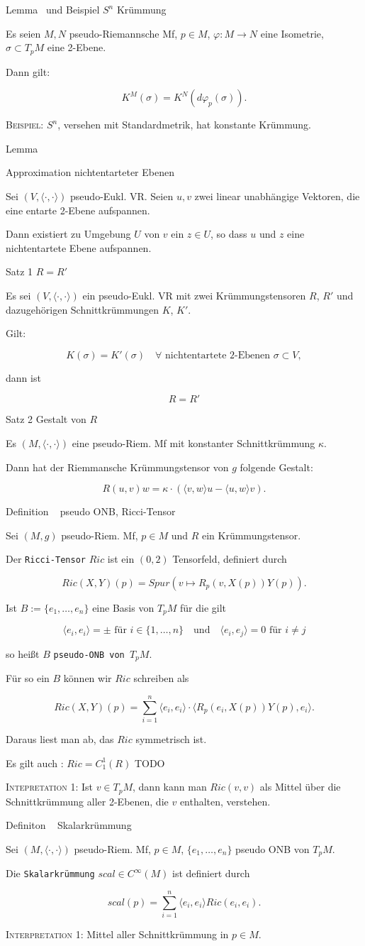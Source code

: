\documentclass[a6paper,11pt,grid=front]{kartei}
\newcommand{\fl}[1]{\begin{flushleft}
 #1 \end{flushleft}}
\newcommand{\blf}[1]{\langle #1 \rangle}
\newcounter{def}
\newcounter{satz}
\newcommand{\defreset}{\setcounter{def}{1}}
\newcommand{\satzreset}{\setcounter{satz}{1}}
\newcommand{\thisdef}{\thedef\ \stepcounter{def}}
\newcommand{\thissatz}{\thesatz\ \stepcounter{satz}}
\begin{document}
\nonameyet
{Lemma \thissatz und Beispiel} {$S^n$ Krümmung}
{
Es seien $M,N$ pseudo-Riemannsche Mf, $p\in M$, $\varphi: M \to N$ eine Isometrie,
$\sigma \subset T_pM$ eine 2-Ebene.
\fl{Dann gilt:}
\[
K^M(\sigma) = K^N(d\varphi_p(\sigma)).
\]
\fl{\textsc{Beispiel:} $S^n$, versehen mit Standardmetrik, hat konstante
Krümmung.}
}
{}

\nonameyet
{Lemma \thissatz} 
{ 
\begin{minipage}{0.43 \linewidth}
Approximation nichtentarteter Ebenen
\end{minipage}
}
{
Sei $(V,\blf{\cdot,\cdot})$ pseudo-Eukl. VR. Seien $u,v$ zwei linear
unabhängige Vektoren, die eine entarte 2-Ebene aufspannen.
\fl{Dann existiert zu Umgebung $U$ von $v$ ein $z\in U$, so dass 
$u$ und $z$ eine nichtentartete Ebene aufspannen.}
}
{}

\nonameyet
{Satz 1} {$R = R'$}
{
	\small
Es sei $(V,\blf{\cdot,\cdot})$ ein pseudo-Eukl. VR mit zwei Krümmungstensoren
$R$, $R'$ und dazugehörigen Schnittkrümmungen $K$, $K'$.
\fl{Gilt:}
\[
K(\sigma) = K'(\sigma) \quad 
\forall \text{ nichtentartete 2-Ebenen } \sigma \subset V,
\]
\fl{dann ist}
\[
R = R'
\]
}
{}

\nonameyet
{Satz 2} {Gestalt von $R$}
{
Es $(M,\blf{\cdot,\cdot})$ eine pseudo-Riem. Mf mit konstanter Schnittkrümmung 
$\kappa$.
\fl{Dann hat der Riemmansche Krümmungstensor von $g$ folgende Gestalt: }
\[
R(u,v)w = \kappa\cdot(\blf{v,w}u - \blf{u,w}v) .
\]
}
{}

\nonameyet
{Definition \thisdef} {pseudo ONB, Ricci-Tensor}
{
	\scriptsize
	\vspace{-3em}
Sei $(M,g)$ pseudo-Riem. Mf, $p\in M$ und $R$ ein Krümmungstensor.
\fl{Der \texttt{Ricci-Tensor} $Ric$ ist ein $(0,2)$ Tensorfeld,
definiert durch }
\[
Ric(X,Y)(p) = Spur(v\mapsto R_p(v,X(p))Y(p)).
\]
\fl{Ist $B:=\{e_1,\dots,e_n\}$ eine Basis von $T_pM$ für die gilt }
\[
\blf{e_i,e_i} = \pm \text{ für } i\in\{1,\dots,n\}
\quad \text{und} \quad 
\blf{e_i,e_j} = 0 \text{ für }  i \neq j
\]
\fl{so heißt $B$ \texttt{pseudo-ONB von $T_pM$}.}
\fl{Für so ein $B$ können wir $Ric$ schreiben als}
\[
Ric(X,Y)(p) 
= \sum_{i=1}^n 
\blf{e_i,e_i} \cdot \blf{R_p(e_i,X(p))Y(p),e_i}.
\]
\fl{Daraus liest man ab, das $Ric$ symmetrisch ist.}
\fl{Es gilt auch : $Ric = C^1_1(R)$ TODO}
\fl{\textsc{Intepretation 1:} Ist $v\in T_pM$, dann kann man $Ric(v,v)$ als
Mittel über die Schnittkrümmung aller 2-Ebenen, die $v$ enthalten, verstehen.}
}
{}

\nonameyet
{Definiton \thisdef} {Skalarkrümmung}
{
	\small
Sei $(M,\blf{\cdot,\cdot})$ pseudo-Riem. Mf, $p\in M$, $\{e_1,\dots,e_n\}$
pseudo ONB von $T_pM$.
\fl{Die \texttt{Skalarkrümmung} $scal\in C^\infty(M)$ ist definiert durch}
\[
scal(p) = \sum_{i=1}^n \blf{e_i,e_i} Ric(e_i,e_i).
\]
\fl{\textsc{Interpretation 1:} Mittel aller Schnittkrümmung in $p\in M$.}
}
{}
\defreset
\satzreset
{}
\end{document}

